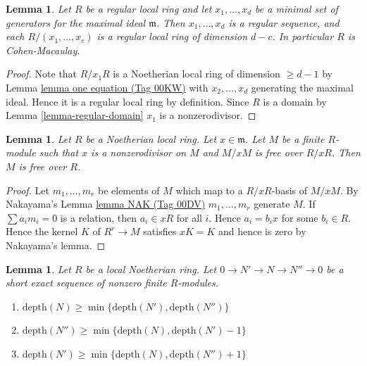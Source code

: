 \documentclass{amsart}
\theoremstyle{plain}
\newtheorem{lemma}[subsection]{Lemma}
\theoremstyle{definition}
\theoremstyle{remark}
\numberwithin{equation}{subsection}
\begin{document}
\begin{lemma}
\label{lemma-regular-ring-CM}
Let $R$ be a regular local ring and let
$x_1, \ldots, x_d$ be a minimal set of generators
for the maximal ideal $\mathfrak m$. Then
$x_1, \ldots, x_d$ is a regular sequence, and
each $R/(x_1, \ldots, x_c)$ is a regular local ring
of dimension $d - c$. In particular $R$ is Cohen-Macaulay.
\end{lemma}

\begin{proof}
Note that $R/x_1R$ is a Noetherian local ring of dimension $\geq d - 1$
by Lemma \href{https://stacks.math.columbia.edu/tag/00KW}{lemma one equation (Tag 00KW)} with $x_2, \ldots, x_d$
generating the maximal ideal. Hence it is a regular local ring by definition.
Since $R$ is a domain by Lemma \ref{lemma-regular-domain}
$x_1$ is a nonzerodivisor.
\end{proof}


\begin{lemma}
\label{lemma-free-mod-x}
Let $R$ be a Noetherian local ring.
Let $x \in \mathfrak m$.
Let $M$ be a finite $R$-module such that
$x$ is a nonzerodivisor on $M$ and
$M/xM$ is free over $R/xR$.
Then $M$ is free over $R$.
\end{lemma}

\begin{proof}
Let $m_1, \ldots, m_r$ be elements of $M$ which map to
a $R/xR$-basis of $M/xM$. By Nakayama's Lemma \href{https://stacks.math.columbia.edu/tag/00DV}{lemma NAK (Tag 00DV)}
$m_1, \ldots, m_r$ generate $M$. If $\sum a_i m_i = 0$
is a relation, then $a_i \in xR$ for all $i$. Hence
$a_i = b_i x$ for some $b_i \in R$. Hence
the kernel $K$ of $R^r \to M$ satisfies $xK = K$
and hence is zero by Nakayama's lemma.
\end{proof}


\begin{lemma}
\label{lemma-depth-in-ses}
Let $R$ be a local Noetherian ring. Let $0 \to N' \to N \to N'' \to 0$
be a short exact sequence of nonzero finite $R$-modules.
\begin{enumerate}
\item
$\text{depth}(N) \geq \min\{\text{depth}(N'), \text{depth}(N'')\}$
\item
$\text{depth}(N'') \geq \min\{\text{depth}(N), \text{depth}(N') - 1\}$
\item
$\text{depth}(N') \geq \min\{\text{depth}(N), \text{depth}(N'') + 1\}$
\end{enumerate}
\end{lemma}
\end{document}
